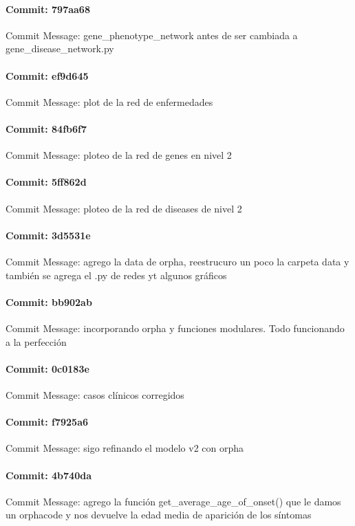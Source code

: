 \documentclass{article}
\begin{document}
\paragraph{Commit: 797aa68}
Commit Message: gene_phenotype_network antes de ser cambiada a gene_disease_network.py

\paragraph{Commit: ef9d645}
Commit Message: plot de la red de enfermedades

\paragraph{Commit: 84fb6f7}
Commit Message: ploteo de la red de genes en nivel 2

\paragraph{Commit: 5ff862d}
Commit Message: ploteo de la red de diseases de nivel 2

\paragraph{Commit: 3d5531e}
Commit Message: agrego la data de orpha, reestrucuro un poco la carpeta data y también se agrega el .py de redes yt algunos gráficos

\paragraph{Commit: bb902ab}
Commit Message: incorporando orpha y funciones modulares. Todo funcionando a la perfección

\paragraph{Commit: 0c0183e}
Commit Message: casos clínicos corregidos

\paragraph{Commit: f7925a6}
Commit Message: sigo refinando el modelo v2 con orpha

\paragraph{Commit: 4b740da}
Commit Message: agrego la función get_average_age_of_onset() que le damos un orphacode y nos devuelve la edad media de aparición de los síntomas
\end{document}
